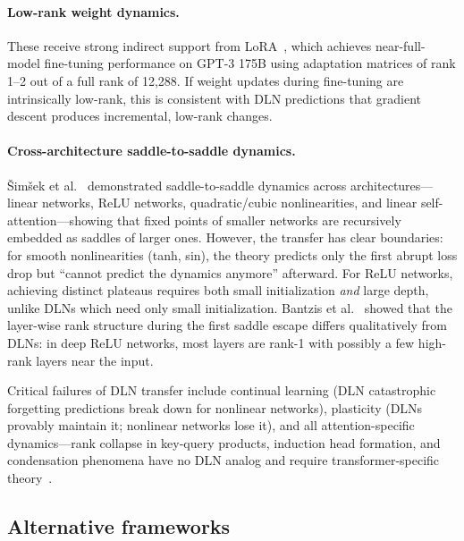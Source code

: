 \documentclass{article}
\theoremstyle{definition}
\begin{document}
\paragraph{Low-rank weight dynamics.} These receive strong indirect support from LoRA~\cite{hu2021lora}, which achieves near-full-model fine-tuning performance on GPT-3 175B using adaptation matrices of rank 1--2 out of a full rank of 12,288. If weight updates during fine-tuning are intrinsically low-rank, this is consistent with DLN predictions that gradient descent produces incremental, low-rank changes.

\paragraph{Cross-architecture saddle-to-saddle dynamics.} \v{S}im\v{s}ek et al.~\cite{simsek2025saddle} demonstrated saddle-to-saddle dynamics across architectures---linear networks, ReLU networks, quadratic/cubic nonlinearities, and linear self-attention---showing that fixed points of smaller networks are recursively embedded as saddles of larger ones. However, the transfer has clear boundaries: for smooth nonlinearities (tanh, sin), the theory predicts only the first abrupt loss drop but ``cannot predict the dynamics anymore'' afterward. For ReLU networks, achieving distinct plateaus requires both small initialization \emph{and} large depth, unlike DLNs which need only small initialization. Bantzis et al.~\cite{bantzis2025relu} showed that the layer-wise rank structure during the first saddle escape differs qualitatively from DLNs: in deep ReLU networks, most layers are rank-1 with possibly a few high-rank layers near the input.

Critical failures of DLN transfer include continual learning (DLN catastrophic forgetting predictions break down for nonlinear networks), plasticity (DLNs provably maintain it; nonlinear networks lose it), and all attention-specific dynamics---rank collapse in key-query products, induction head formation, and condensation phenomena have no DLN analog and require transformer-specific theory~\cite{wang2024condensation}.

\subsection{Alternative frameworks}
\end{document}
